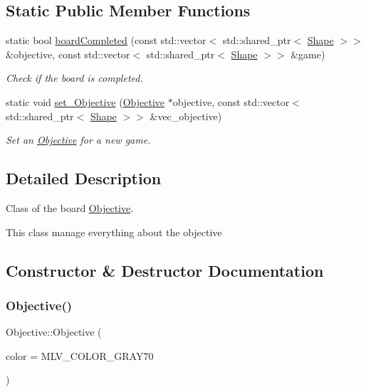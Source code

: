 \subsection*{Static Public Member Functions}
\begin{DoxyCompactItemize}
\item 
static bool \hyperlink{classObjective_aba5fe938ebccb3825d6b03cd789d6d61}{board\+Completed} (const std\+::vector$<$ std\+::shared\+\_\+ptr$<$ \hyperlink{classShape}{Shape} $>$$>$ \&objective, const std\+::vector$<$ std\+::shared\+\_\+ptr$<$ \hyperlink{classShape}{Shape} $>$$>$ \&game)
\begin{DoxyCompactList}\small\item\em Check if the board is completed. \end{DoxyCompactList}\item 
static void \hyperlink{classObjective_af6afb1e7baaaacc73a4c3554f3043407}{set\+\_\+\+Objective} (\hyperlink{classObjective}{Objective} $\ast$objective, const std\+::vector$<$ std\+::shared\+\_\+ptr$<$ \hyperlink{classShape}{Shape} $>$$>$ \&vec\+\_\+objective)
\begin{DoxyCompactList}\small\item\em Set an \hyperlink{classObjective}{Objective} for a new game. \end{DoxyCompactList}\end{DoxyCompactItemize}


\subsection{Detailed Description}
Class of the board \hyperlink{classObjective}{Objective}. 

This class manage everything about the objective 

\subsection{Constructor \& Destructor Documentation}
\mbox{\label{classObjective_ae515d38979a806a95f9476f4437311ab}} 
\subsubsection{\texorpdfstring{Objective()}{Objective()}\hspace{0.1cm}{\footnotesize\ttfamily [1/2]}}
{\footnotesize\ttfamily Objective\+::\+Objective (\begin{DoxyParamCaption}\item[{M\+L\+V\+\_\+\+Color}]{color = {\ttfamily MLV\+\_\+COLOR\+\_\+GRAY70} }\end{DoxyParamCaption})\hspace{0.3cm}{\ttfamily [explicit]}}




